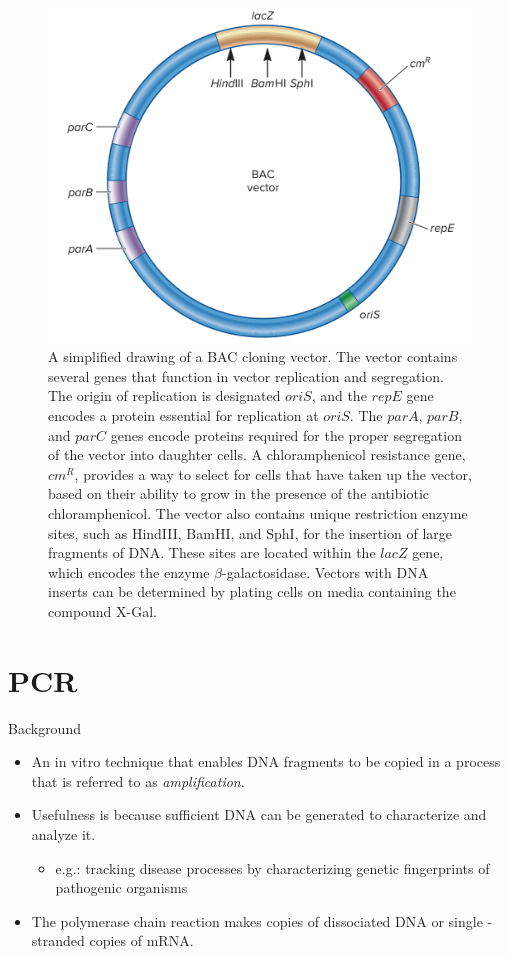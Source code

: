 \documentclass[
  ignorenonframetext,
  aspectratio=169]{beamer}
\providecommand{\tightlist}{%
  \setlength{\itemsep}{0pt}\setlength{\parskip}{0pt}}
\begin{document}
\begin{frame}{}
\protect\hypertarget{section-4}{}
\begin{figure}

{\centering \includegraphics[width=0.56\linewidth]{../images/bac_vector} 

}

\caption{A simplified drawing of a BAC cloning vector. The vector contains several genes that function in vector replication and segregation. The origin of replication is designated $oriS$, and the $repE$ gene encodes a protein essential for replication at $oriS$. The $parA$, $parB$, and $parC$ genes encode proteins required for the proper segregation of the vector into daughter cells. A chloramphenicol resistance gene, $cm^R$, provides a way to select for cells that have taken up the vector, based on their ability to grow in the presence of the antibiotic chloramphenicol. The vector also contains unique restriction enzyme sites, such as HindIII, BamHI, and SphI, for the insertion of large fragments of DNA. These sites are located within the $lacZ$ gene, which encodes the enzyme $\beta$-galactosidase. Vectors with DNA inserts can be determined by plating cells on media containing the compound X-Gal.}\label{fig:bac-vector}
\end{figure}
\end{frame}

\hypertarget{pcr}{%
\section{PCR}\label{pcr}}

\begin{frame}{Background}
\protect\hypertarget{background-1}{}
\begin{itemize}
\tightlist
\item
  An in vitro technique that enables DNA fragments to be copied in a
  process that is referred to as \emph{amplification}.
\item
  Usefulness is because sufficient DNA can be generated to characterize
  and analyze it.

  \begin{itemize}
  \tightlist
  \item
    e.g.: tracking disease processes by characterizing genetic
    fingerprints of pathogenic organisms
  \end{itemize}
\item
  The polymerase chain reaction makes copies of dissociated DNA or
  single - stranded copies of mRNA.
\end{itemize}
\end{frame}
\end{document}
